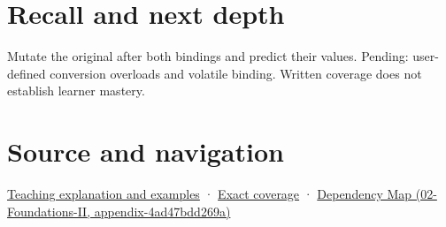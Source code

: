\section{Recall and next depth}\label{appendix-37856d997bb0-recall-and-next-depth}

Mutate the original after both bindings and predict their values. Pending: user-defined conversion overloads and volatile binding. Written coverage does not establish learner mastery.

\section{Source and navigation}\label{appendix-37856d997bb0-source-and-navigation}

\href{Continuous\%20Notes/Computing\%20Foundations\%20-\%20From\%20Bits\%20to\%20C++\%20and\%20Systems\%20APIs\#Binding\%20chooses\%20a\%20referent,\%20not\%20always\%20the\%20one\%20you\%20imagined}{Teaching explanation and examples} · \hyperref[appendix-fd090d982a15-m008---parts-113-126]{Exact coverage} · \href{../02-Foundations-II/main.pdf\#nameddest=appendix-4ad47bdd269a}{Dependency Map (02-Foundations-II, appendix-4ad47bdd269a)}
